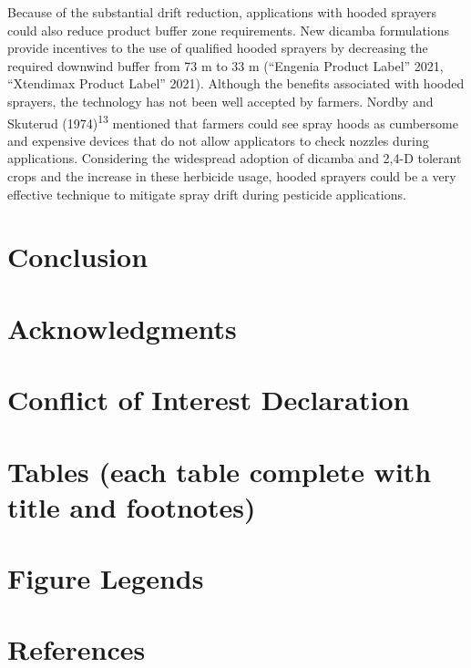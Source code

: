 \documentclass[
  12pt,
  a4paper,
]{article}
\begin{document}
Because of the substantial drift reduction, applications with hooded
sprayers could also reduce product buffer zone requirements. New dicamba
formulations provide incentives to the use of qualified hooded sprayers
by decreasing the required downwind buffer from 73 m to 33 m (``Engenia
Product Label'' 2021, ``Xtendimax Product Label'' 2021). Although the
benefits associated with hooded sprayers, the technology has not been
well accepted by farmers. Nordby and Skuterud (1974)\textsuperscript{13}
mentioned that farmers could see spray hoods as cumbersome and expensive
devices that do not allow applicators to check nozzles during
applications. Considering the widespread adoption of dicamba and 2,4-D
tolerant crops and the increase in these herbicide usage, hooded
sprayers could be a very effective technique to mitigate spray drift
during pesticide applications.

\hypertarget{conclusion}{%
\section{Conclusion}\label{conclusion}}

\hypertarget{acknowledgments}{%
\section{Acknowledgments}\label{acknowledgments}}

\hypertarget{conflict-of-interest-declaration}{%
\section{Conflict of Interest
Declaration}\label{conflict-of-interest-declaration}}

\hypertarget{tables-each-table-complete-with-title-and-footnotes}{%
\section{Tables (each table complete with title and
footnotes)}\label{tables-each-table-complete-with-title-and-footnotes}}

\hypertarget{figure-legends}{%
\section{Figure Legends}\label{figure-legends}}

\hypertarget{references}{%
\section*{References}\label{references}}
\end{document}
